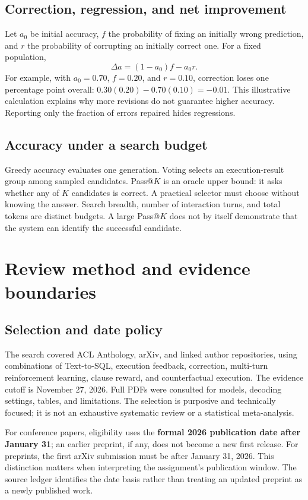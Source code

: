 \documentclass[11pt,a4paper]{article}
\begin{document}
\subsection{Correction, regression, and net improvement}
Let $a_0$ be initial accuracy, $f$ the probability of fixing an initially wrong prediction, and $r$ the probability of corrupting an initially correct one. For a fixed population,
\begin{equation}
\Delta a=(1-a_0)f-a_0r.
\end{equation}
For example, with $a_0=0.70$, $f=0.20$, and $r=0.10$, correction loses one percentage point overall: $0.30(0.20)-0.70(0.10)=-0.01$. This illustrative calculation explains why more revisions do not guarantee higher accuracy. Reporting only the fraction of errors repaired hides regressions.

\subsection{Accuracy under a search budget}
Greedy accuracy evaluates one generation. Voting selects an execution-result group among sampled candidates. Pass@$K$ is an oracle upper bound: it asks whether any of $K$ candidates is correct. A practical selector must choose without knowing the answer. Search breadth, number of interaction turns, and total tokens are distinct budgets. A large Pass@$K$ does not by itself demonstrate that the system can identify the successful candidate.

\clearpage
\section{Review method and evidence boundaries}
\subsection{Selection and date policy}
The search covered ACL Anthology, arXiv, and linked author repositories, using combinations of Text-to-SQL, execution feedback, correction, multi-turn reinforcement learning, clause reward, and counterfactual execution. The evidence cutoff is November 27, 2026. Full PDFs were consulted for models, decoding settings, tables, and limitations. The selection is purposive and technically focused; it is not an exhaustive systematic review or a statistical meta-analysis.

For conference papers, eligibility uses the \textbf{formal 2026 publication date after January 31}; an earlier preprint, if any, does not become a new first release. For preprints, the first arXiv submission must be after January 31, 2026. This distinction matters when interpreting the assignment's publication window. The source ledger identifies the date basis rather than treating an updated preprint as a newly published work.
\end{document}
